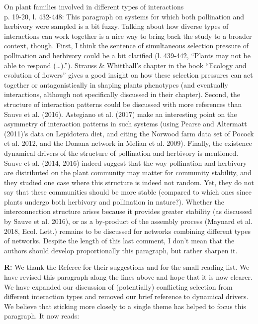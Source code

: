 \documentclass[12pt]{letter}
\newenvironment{refquote}{\bigskip \begin{it}}{\end{it}\smallskip}
\begin{document}
		\begin{refquote}
			On plant families involved in different types of interactions\\

			p. 19-20, l. 432-448: This paragraph on systems for which both pollination and herbivory were sampled is a bit fuzzy. Talking about how diverse types of interactions can work together is a nice way to bring back the study to a broader context, though.
			First, I think the sentence of simultaneous selection pressure of pollination and herbivory could be a bit clarified (l. 439-442, “Plants may not be able to respond (…).”). Strauss \& Whitthall’s chapter in the book “Ecology and evolution of flowers” gives a good insight on how these selection pressures can act together or antagonistically in shaping plants phenotypes (and eventually interactions, although not specifically discussed in their chapter).
			Second, the structure of interaction patterns could be discussed with more references than Sauve et al. (2016). Astegiano et al. (2017) make an interesting point on the asymmetry of interaction patterns in such systems (using Pearse and Altermatt (2011)’s data on Lepidotera diet, and citing the Norwood farm data set of Pocock et al. 2012, and the Donana network in Melian et al. 2009).
			Finally, the existence dynamical drivers of the structure of pollination and herbivory is mentioned. Sauve et al. (2014, 2016) indeed suggest that the way pollination and herbivory are distributed on the plant community may matter for community stability, and they studied one case where this structure is indeed not random. Yet, they do not say that these communities should be more stable (compared to which ones since plants undergo both herbivory and pollination in nature?). Whether the interconnection structure arises because it provides greater stability (as discussed by Sauve et al. 2016), or as a by-product of the assembly process (Maynard et al. 2018, Ecol. Lett.) remains to be discussed for networks combining different types of networks.
			Despite the length of this last comment, I don’t mean that the authors should develop proportionally this paragraph, but rather sharpen it.
		\end{refquote}


		\textbf{R:} We thank the Referee for their suggestions and for the small reading list. We have revised this paragraph along the lines above and hope that it is now clearer. We have expanded our discussion of (potentially) conflicting selection from different interaction types and removed our brief reference to dynamical drivers. We believe that sticking more closely to a single theme has helped to focus this paragraph. It now reads:
\end{document}

